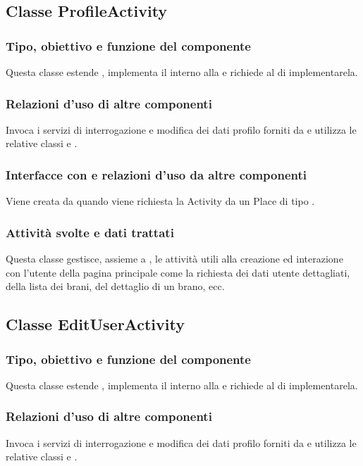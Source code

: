 \subsection{Classe ProfileActivity}
\subsubsection*{Tipo, obiettivo e funzione del componente}
Questa classe estende , implementa il 
interno alla  e richiede al  di
implementarela.
\subsubsection*{Relazioni d'uso di altre componenti}
Invoca i servizi di interrogazione e modifica dei dati profilo forniti da
 e utilizza le relative classi  e
.
\subsubsection*{Interfacce con e relazioni d'uso da altre componenti}
Viene creata da  quando viene richiesta la Activity da
un Place di tipo .
\subsubsection*{Attivit\`a svolte e dati trattati}
Questa classe gestisce, assieme a , le attivit\`a utili alla
creazione ed interazione con l'utente della pagina principale come la
richiesta dei dati utente dettagliati, della lista dei brani, del dettaglio di
un brano, ecc.

\subsection{Classe EditUserActivity}
\subsubsection*{Tipo, obiettivo e funzione del componente}
Questa classe estende , implementa il 
interno alla  e richiede al  di
implementarela.
\subsubsection*{Relazioni d'uso di altre componenti}
Invoca i servizi di interrogazione e modifica dei dati profilo forniti da
 e utilizza le relative classi  e
.
